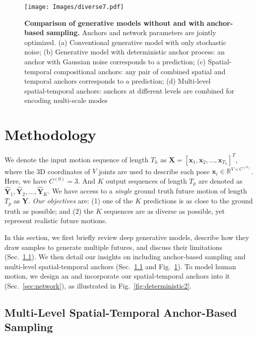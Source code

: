 \begin{figure}
\centering
\texttt{[image: Images/diverse7.pdf]}
\caption{\textbf{Comparison of generative models without and with anchor-based sampling.} Anchors and network parameters are jointly optimized. (a) Conventional generative model with only stochastic noise; (b) Generative model with deterministic anchor process: an anchor with Gaussian noise corresponds to a prediction; (c) Spatial-temporal compositional anchors: any pair of combined spatial and temporal anchors corresponds to a prediction; (d) Multi-level spatial-temporal anchors: anchors at different levels are combined for encoding multi-scale modes}
\label{fig:diverse}
\end{figure}

\section{Methodology}
\label{sec:method}

We denote the input motion sequence of length $T_h$ as $\mathbf X=[\mathbf x_1, \mathbf x_2,\ldots,\mathbf x_{T_h}]^T$,
where the 3D coordinates of $V$ joints are used to describe each pose $\mathbf x_i \in \mathbb{R}^{{V}\times C^{(0)}}$. 
Here, we have $C^{(0)} = 3$. 
And $K$ output sequences of length $T_p$ are denoted as $\mathbf{\widehat{Y}}_1, \mathbf{\widehat{Y}}_2, \ldots, \mathbf{\widehat{Y}}_K$. We have access to a {\em{single}} ground truth future motion of length $T_p$ as $\mathbf{Y}$.
{\it{Our objectives}} are: (1) one of the $K$ predictions is as close to the ground truth as possible; and (2) the $K$ sequences are as diverse as possible, yet represent realistic future motions.

In this section, we first briefly review deep generative models, describe how they draw samples to generate multiple futures, and discuss their limitations (Sec.~\ref{sec:shmp}). We then detail our insights on \oursanchor{} including anchor-based sampling and multi-level spatial-temporal anchors (Sec.~\ref{sec:shmp} and Fig.~\ref{fig:diverse}). To model human motion, we design an \oursmodel{} and incorporate our spatial-temporal anchors into it (Sec.~\ref{sec:network}), as illustrated in Fig.~\ref{fig:deterministic2}.

\subsection{Multi-Level Spatial-Temporal Anchor-Based Sampling}\label{sec:shmp}


